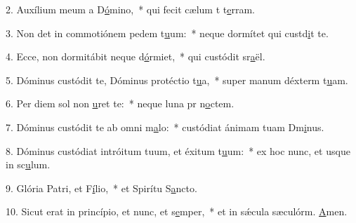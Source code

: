 2. Auxílium meum a D\uline{ó}mino,~* qui fecit cælum t t\uline{e}rram.\par 
3. Non det in commotiónem pedem t\uline{u}um:~* neque dormítet qui custd\uline{i}t te.\par 
4. Ecce, non dormitábit neque d\uline{ó}rmiet,~* qui custódit sr\uline{a}ël.\par 
5. Dóminus custódit te, Dóminus protéctio t\uline{u}a,~* super manum déxterm t\uline{u}am.\par 
6. Per diem sol non \uline{u}ret te:~* neque luna pr n\uline{o}ctem.\par 
7. Dóminus custódit te ab omni m\uline{a}lo:~* custódiat ánimam tuam Dm\uline{i}nus.\par 
8. Dóminus custódiat intróitum tuum, et éxitum t\uline{u}um:~* ex hoc nunc, et usque in sc\uline{u}lum.\par 
9. Glória Patri, et F\uline{í}lio,~* et Spirítu S\uline{a}ncto.\par 
10. Sicut erat in princípio, et nunc, et s\uline{e}mper,~* et in sǽcula sæculórm. \uline{A}men.\par 
